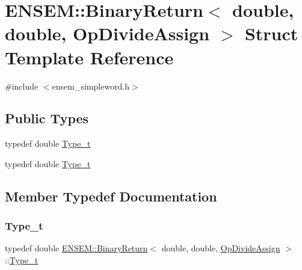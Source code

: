 \hypertarget{structENSEM_1_1BinaryReturn_3_01double_00_01double_00_01OpDivideAssign_01_4}{}\section{E\+N\+S\+EM\+:\+:Binary\+Return$<$ double, double, Op\+Divide\+Assign $>$ Struct Template Reference}
\label{structENSEM_1_1BinaryReturn_3_01double_00_01double_00_01OpDivideAssign_01_4}


{\ttfamily \#include $<$ensem\+\_\+simpleword.\+h$>$}

\subsection*{Public Types}
\begin{DoxyCompactItemize}
\item 
typedef double \mbox{\hyperlink{structENSEM_1_1BinaryReturn_3_01double_00_01double_00_01OpDivideAssign_01_4_aa4a7939a8bbedada7f3b6703da6902f7}{Type\+\_\+t}}
\item 
typedef double \mbox{\hyperlink{structENSEM_1_1BinaryReturn_3_01double_00_01double_00_01OpDivideAssign_01_4_aa4a7939a8bbedada7f3b6703da6902f7}{Type\+\_\+t}}
\end{DoxyCompactItemize}


\subsection{Member Typedef Documentation}
\mbox{\label{structENSEM_1_1BinaryReturn_3_01double_00_01double_00_01OpDivideAssign_01_4_aa4a7939a8bbedada7f3b6703da6902f7}} 
\subsubsection{\texorpdfstring{Type\_t}{Type\_t}\hspace{0.1cm}{\footnotesize\ttfamily [1/2]}}
{\footnotesize\ttfamily typedef double \mbox{\hyperlink{structENSEM_1_1BinaryReturn}{E\+N\+S\+E\+M\+::\+Binary\+Return}}$<$ double, double, \mbox{\hyperlink{structENSEM_1_1OpDivideAssign}{Op\+Divide\+Assign}} $>$\+::\mbox{\hyperlink{structENSEM_1_1BinaryReturn_3_01double_00_01double_00_01OpDivideAssign_01_4_aa4a7939a8bbedada7f3b6703da6902f7}{Type\+\_\+t}}}

